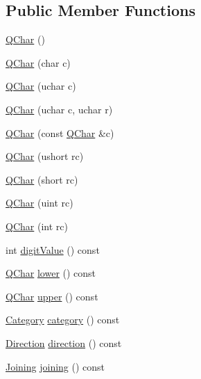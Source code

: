 \subsection*{Public Member Functions}
\begin{DoxyCompactItemize}
\item 
\mbox{\hyperlink{class_q_char_a982aca321d746686396ab5290955da95}{Q\+Char}} ()
\item 
\mbox{\hyperlink{class_q_char_a9d4a3fc3b41479f13c1174995d1390d5}{Q\+Char}} (char c)
\item 
\mbox{\hyperlink{class_q_char_a4b67f8efac359d10c3c2b279624d1002}{Q\+Char}} (uchar c)
\item 
\mbox{\hyperlink{class_q_char_a7f5f54e09c49f6ea21627b924e9240c1}{Q\+Char}} (uchar c, uchar r)
\item 
\mbox{\hyperlink{class_q_char_a66d7c1c6f835a49d4486cb960c43f1da}{Q\+Char}} (const \mbox{\hyperlink{class_q_char}{Q\+Char}} \&c)
\item 
\mbox{\hyperlink{class_q_char_a7145ea443cffb41db0d4ed23285831e3}{Q\+Char}} (ushort rc)
\item 
\mbox{\hyperlink{class_q_char_a548ce01f65d8afbaff0d03c78d5453da}{Q\+Char}} (short rc)
\item 
\mbox{\hyperlink{class_q_char_ab508e623fe37bdcd7d855539baaf846c}{Q\+Char}} (uint rc)
\item 
\mbox{\hyperlink{class_q_char_aa16b5930b815ea41ab29112fe3d7a378}{Q\+Char}} (int rc)
\item 
int \mbox{\hyperlink{class_q_char_ac23377922296b84ca58ffaaee6d522af}{digit\+Value}} () const
\item 
\mbox{\hyperlink{class_q_char}{Q\+Char}} \mbox{\hyperlink{class_q_char_a70eb37a2ce831bffec68645ec51dc77f}{lower}} () const
\item 
\mbox{\hyperlink{class_q_char}{Q\+Char}} \mbox{\hyperlink{class_q_char_a4418e0d46d515231d620263cd7fd0c1f}{upper}} () const
\item 
\mbox{\hyperlink{class_q_char_a62908095db0c54f35ff2ae928c621a97}{Category}} \mbox{\hyperlink{class_q_char_a4bc1ffcdc40c674015b3bb9e9114637e}{category}} () const
\item 
\mbox{\hyperlink{class_q_char_a54978126be7630b3e85394325a822302}{Direction}} \mbox{\hyperlink{class_q_char_ad01050969cdddf81a9d956a93da209c6}{direction}} () const
\item 
\mbox{\hyperlink{class_q_char_a086edd55a90ad2cf910ca3ab5fbe7bde}{Joining}} \mbox{\hyperlink{class_q_char_ad009b86964d2cced7c75235f3292b03f}{joining}} () const

\end{DoxyCompactItemize}
